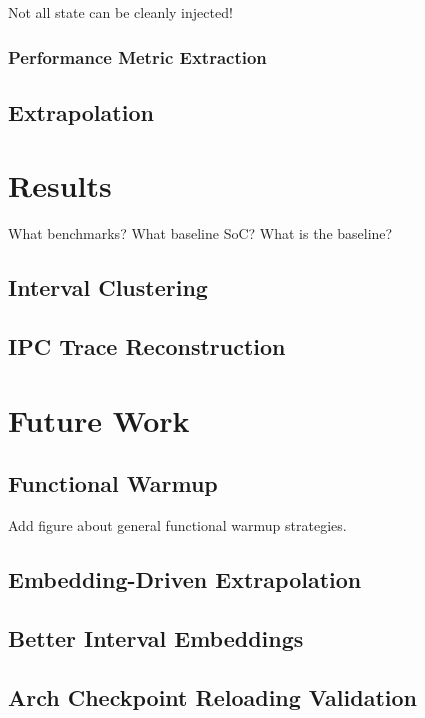 \documentclass[sigplan,nonacm,10pt]{acmart}
\begin{document}
Not all state can be cleanly injected!

\subsubsection{Performance Metric Extraction}

\subsection{Extrapolation}

\section{Results}

What benchmarks?
What baseline SoC?
What is the baseline?

\subsection{Interval Clustering}

\subsection{IPC Trace Reconstruction}

\section{Future Work}

\subsection{Functional Warmup}

Add figure about general functional warmup strategies.

\subsection{Embedding-Driven Extrapolation}

\subsection{Better Interval Embeddings}

\subsection{Arch Checkpoint Reloading Validation}
\end{document}
